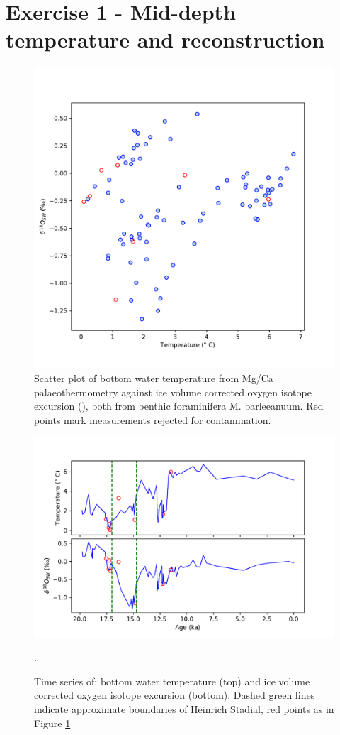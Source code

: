 \section{Exercise 1 - Mid-depth temperature and  reconstruction}

\begin{figure}
\includegraphics[width=\textwidth]{img/scatter_temp_x_d18Osw}
    \caption{Scatter plot of bottom water temperature from Mg/Ca palaeothermometry against ice volume corrected oxygen isotope excursion (), both from benthic foraminifera M. barleeanuum.
             Red points mark measurements rejected for contamination.}
        \label{fig:tempxd18Osw}
\end{figure}

\begin{figure}
\includegraphics[width=\textwidth]{img/timeseries_temp_and_d18Osw}
    \caption{Time series of: bottom water temperature (top) and ice volume corrected oxygen isotope excursion (bottom).
             Dashed green lines indicate approximate boundaries of Heinrich Stadial, red points as in Figure \ref{fig:tempxd18Osw}}.
        \label{fig:timeseriestempd18Osw}
\end{figure}
